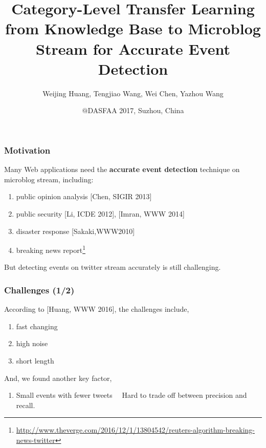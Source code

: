 \documentclass{beamer}
\begin{document}
\title[Category-Level Transfer Learning from Knowledge Base to Microblog Stream for Accurate Event Detection]{Category-Level Transfer Learning from Knowledge Base to Microblog Stream for Accurate Event Detection}
\author[Weijing Huang, et,al.]{Weijing Huang, Tengjiao Wang, Wei Chen, Yazhou Wang}
\date{\(\bm{@}\)DASFAA 2017, Suzhou, China}
\maketitle

\begin{frame}
\frametitle{Motivation}

Many Web applications need the \textbf{accurate event detection} technique on microblog stream, including:
\begin{enumerate}
	\item public opinion analysis [Chen, SIGIR 2013]
	\item public security [Li, ICDE 2012], [Imran, WWW 2014]
	\item disaster response [Sakaki,WWW2010]
	\item breaking news report\footnote{\url{http://www.theverge.com/2016/12/1/13804542/reuters-algorithm-breaking-news-twitter}}
\end{enumerate}	
\vfill

But detecting events on twitter stream accurately is still challenging.
\end{frame}

\begin{frame}
\frametitle{Challenges (1/2)}
According to [Huang, WWW 2016], the challenges include,
\begin{enumerate}
\item fast changing
\item high noise
\item short length
\end{enumerate}	

\vfill

And, we found another key factor, 
\begin{enumerate}
\item Small events with fewer tweets \MVRightarrow \ \ Hard to trade off between precision and recall. 
\end{enumerate}




\end{frame}
\end{document}
